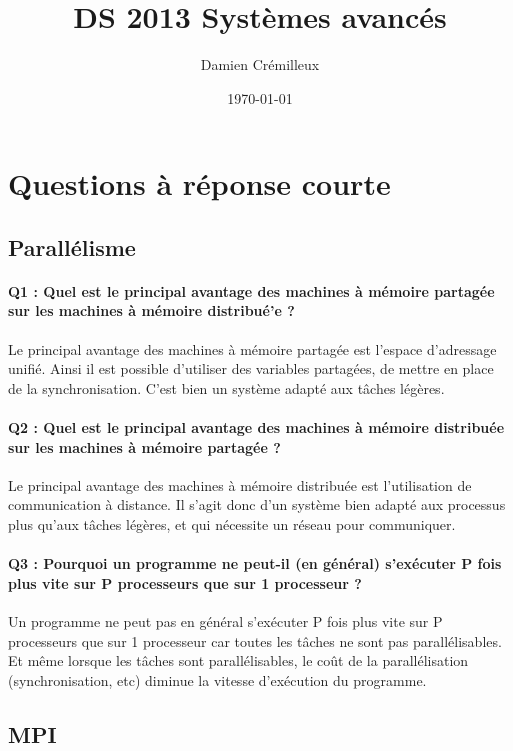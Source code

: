\documentclass[a4paper]{article}
\begin{document}
\title{DS 2013 Systèmes avancés}
\author{Damien Crémilleux}
\date{\today}

\maketitle

\section{Questions à réponse courte}

\subsection{Parallélisme}

\paragraph{Q1 : Quel est le principal avantage des machines à mémoire partagée sur les machines à mémoire distribué'e ?}
Le principal avantage des machines à mémoire partagée est l'espace d'adressage unifié. Ainsi il est possible d'utiliser des variables partagées, de mettre en place de la synchronisation. C'est bien un système adapté aux tâches légères.

\paragraph{Q2 : Quel est le principal avantage des machines à mémoire distribuée sur les machines à mémoire partagée ?}
Le principal avantage des machines à mémoire distribuée est l'utilisation de communication à distance. Il s'agit donc d'un système bien adapté aux processus plus qu'aux tâches légères, et qui nécessite un réseau pour communiquer.

\paragraph{Q3 : Pourquoi un programme ne peut-il (en général) s'exécuter P fois plus vite sur P processeurs que sur 1 processeur ?}
Un programme ne peut pas en général s'exécuter P fois plus vite sur P processeurs que sur 1 processeur car toutes les tâches ne sont pas parallélisables. Et même lorsque les tâches sont parallélisables, le coût de la parallélisation (synchronisation, etc) diminue la vitesse d'exécution du programme.

\subsection{MPI}
\end{document}
